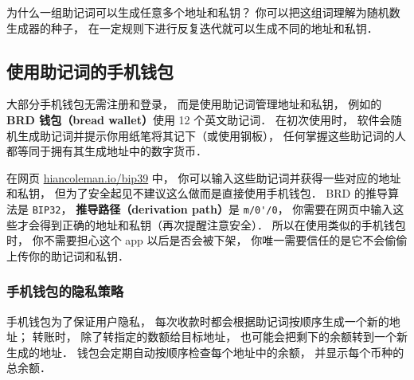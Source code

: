 为什么一组助记词可以生成任意多个地址和私钥？ 你可以把这组词理解为随机数生成器的种子， 在一定规则下进行反复迭代就可以生成不同的地址和私钥．

\subsection{使用助记词的手机钱包}
大部分手机钱包无需注册和登录， 而是使用助记词管理地址和私钥， 例如的 \textbf{BRD 钱包（bread wallet）}使用 12 个英文助记词． 在初次使用时， 软件会随机生成助记词并提示你用纸笔将其记下（或使用钢板）， 任何掌握这些助记词的人都等同于拥有其生成地址中的数字货币．

在网页 \href{https://iancoleman.io/bip39/}{hiancoleman.io/bip39} 中， 你可以输入这些助记词并获得一些对应的地址和私钥， 但为了安全起见不建议这么做而是直接使用手机钱包． BRD 的推导算法是 \verb|BIP32|， \textbf{推导路径（derivation path）}是 \verb|m/0'/0|， 你需要在网页中输入这些才会得到正确的地址和私钥（再次提醒注意安全）． 所以在使用类似的手机钱包时， 你不需要担心这个 app 以后是否会被下架， 你唯一需要信任的是它不会偷偷上传你的助记词和私钥．

\subsubsection{手机钱包的隐私策略}
手机钱包为了保证用户隐私， 每次收款时都会根据助记词按顺序生成一个新的地址； 转账时， 除了转指定的数额给目标地址， 也可能会把剩下的余额转到一个新生成的地址． 钱包会定期自动按顺序检查每个地址中的余额， 并显示每个币种的总余额．
